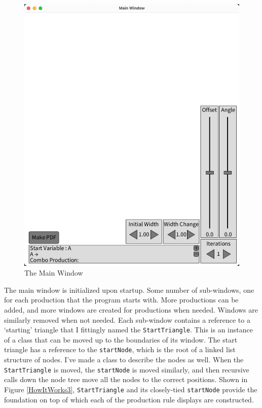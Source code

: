 \documentclass[12pt,twoside]{reedthesis}
\newcommand{\code}[1]{\texttt{#1}}
\begin{document}
	\begin{figure}[h!]
	\centering
	\includegraphics[scale=0.5]{Images/HowItWorks1}
	\caption{The Main Window}
	\label {MainWindow}
	\end{figure}

	
	The main window is initialized upon startup. Some number of sub-windows, one for each production that the program starts with. More productions can be added, and more windows are created for productions when needed. Windows are similarly removed when not needed. Each sub-window contains a reference to a `starting' triangle that I fittingly named the \code{StartTriangle}. This is an instance of a class that can be moved up to the boundaries of its window. The start triangle has a reference to the \code{startNode}, which is the root of a linked list structure of nodes. I've made a class to describe the nodes as well. When the \code{StartTriangle} is moved, the \code{startNode} is moved similarly, and then recursive calls down the node tree move all the nodes to the correct positions. Shown in Figure \ref{HowItWorks3}, \code{StartTriangle} and its closely-tied \code{startNode} provide the foundation on top of which each of the production rule displays are constructed.
	
\end{document}
